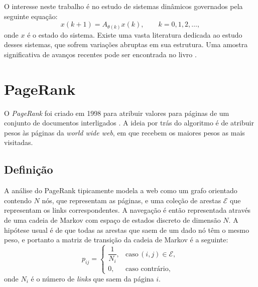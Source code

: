 \documentclass[a0,portrait]{a0poster}
\begin{document}
\begin{multicols}{2}
O interesse neste trabalho \'e no estudo de sistemas din\^amicos governados pela seguinte equa\c{c}\~ao:
%
\begin{equation} \label{xAB}
	x(k+1) = A_{\theta(k)} x(k),\qquad k=0,1,2,\ldots,
\end{equation}
%
onde $x$ \'e o estado do sistema. Existe uma vasta literatura dedicada ao estudo desses sistemas, que sofrem varia\c{c}\~oes abruptas em sua estrutura. Uma amostra significativa de avan\c{c}os recentes pode ser encontrada no livro \cite{costafragosotodorov}.\\[-2em]

\section{PageRank}

O \textit{PageRank} foi criado em 1998 para atribuir valores para p\'aginas de um conjunto de documentos interligados \cite{pagerankSIREV}. A ideia por tr\'as do algoritmo \'e de atribuir pesos \`as p\'aginas da \textit{world wide web}, em que recebem os maiores pesos as mais visitadas.\\[-2em]

\subsection{Defini\c{c}\~ao}

A an\'alise do PageRank tipicamente modela a web como um grafo orientado contendo $N$ n\'os, que representam as p\'aginas, e uma cole\c{c}\~ao de arestas $\mathcal{E}$ que representam os links correspondentes. A navega\c{c}\~ao \'e ent\~ao representada atrav\'es de uma cadeia de Markov com espa\c{c}o de estados discreto de dimens\~ao $N$. A hip\'otese usual \'e de que todas as arestas que saem de um dado n\'o t\^em o mesmo peso, e portanto a matriz de transi\c{c}\~ao da cadeia de Markov \'e a seguinte:
%
\begin{equation}
p_{ij} = \begin{cases}
\dfrac{1}{N_i}, & \text{caso}\, (i,j)\in \mathcal{E},\\
0, & \text{caso contr\'ario},
\end{cases}
\end{equation}
%
onde $N_i$ \'e o n\'umero de \textit{links} que saem da p\'agina $i$.


\end{multicols}
\end{document}
